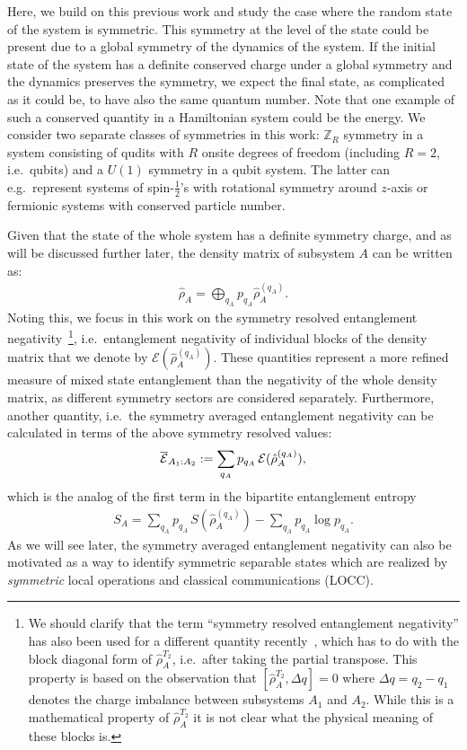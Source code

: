 \documentclass[aps,pra,reprint,superscriptaddress,twocolumn,notitlepage]{revtex4-1}
\newcommand{\rTa}{{\hat\rho^{T_2}_A} }
\numberwithin{equation}{section}
\begin{document}
Here, we build on this previous work and study the case where the random state of the system is symmetric. This symmetry at the level of the state could be present due to a global symmetry of the dynamics of the system. If the initial state of the system has a definite  conserved charge under a global symmetry and the dynamics preserves the symmetry, we expect the final state, as complicated as it could be, to have also the same quantum number.
Note that one example of such a conserved quantity in a Hamiltonian system could be the energy. We consider two separate classes of symmetries in this work: $\mathbb{Z}_R$ symmetry in a system consisting of qudits with $R$ onsite degrees of freedom (including $R=2$, i.e.~qubits) and a $U(1)$ symmetry in a qubit system. 
The latter can e.g.~represent systems of spin-$\frac{1}{2}$'s with rotational symmetry around $z$-axis or fermionic systems with conserved particle number.


Given that the state of the whole system has a definite symmetry charge, and as will be discussed further later, the density matrix of subsystem $A$ can be written as:
\begin{align*}
    \hat \rho_{A}= \bigoplus_{q_A} p_{q_A} \hat  \rho_A^{(q_A)}.
\end{align*}
Noting this, we focus in this work on the symmetry resolved entanglement negativity~\footnote{We should clarify that the term ``symmetry resolved entanglement negativity'' has also been used for a different quantity recently~\cite{Cornfeld2018, Murciano,Neven2021}, which has to do with the block diagonal form of $\rTa$, i.e.~after taking the partial transpose. This property is based on the observation that $[\rTa, \Delta q]=0$ where $\Delta q =q_2 -q_1$ denotes the charge imbalance between subsystems $A_1$ and $A_2$. While this is a mathematical property of $\rTa$ it is not clear what the physical meaning of these blocks is. }, i.e.~entanglement negativity of individual blocks of the density matrix that we denote by $\mathcal{E}(\hat\rho_{A}^{(q_A)})$. These quantities represent a more refined measure of mixed state entanglement than the negativity of the whole density matrix, as different symmetry sectors are considered separately. Furthermore, another quantity, i.e.~the symmetry averaged entanglement negativity can be calculated in terms of the above symmetry resolved values:
\begin{align}
\label{eq:logneg-symmetry}
    \overline{\cal E}_{A_1:A_2} := \sum_{q_A} p_{q_A}\, {\cal E}(\hat\rho_A^{(q_A)}),  
\end{align}
which is the analog of the first term in the bipartite entanglement entropy
\begin{align}
    S_{A} = \sum_{{q_A}} p_{q_A}\, S(\hat\rho_A^{({q_A})})  -\sum_{q_A} p_{q_A} \log p_{q_A}.
\end{align}
As we will see later, the symmetry averaged entanglement negativity can also be motivated as a way to identify symmetric separable states which are realized by {\it symmetric} local operations and classical communications (LOCC).
\end{document}
